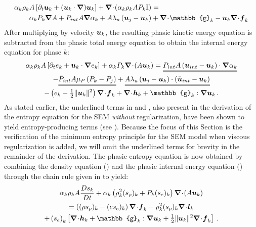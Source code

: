 %
\begin{align}\label{eq:vel-7-eqn-model-sect4}
\alpha_k \rho_k  A \left[ \partial_t \mbold u_k + (\mbold u_k \cdot \grad) \mbold u_k \right]  + \div \left( \alpha_k \rho_k A P_k \mathbb{I} \right) &=\nonumber\\
\alpha_k P_k \grad A + P_{int} A \grad \alpha_k + A \lambda_u \left( \mbold u_j - \mbold u_k \right) &+ \div \mathbb{g}_k - \mbold u_k \div \mbold f_k
\end{align}
%
After multiplying  by velocity $\boldsymbol u_k$, the resulting phasic kinetic energy equation is subtracted 
from the phasic total energy equation to obtain the internal energy equation for phase $k$:
%
\begin{multline}\label{eq:int-ener-7-eqn-model-sect4}
\alpha_k \rho_k  A \left[ \partial_t  e_k + \mbold u_k \cdot \grad  e_k \right]  
+ \alpha_k P_k \div (A \mbold u_k ) =
  \underline{\underline{P_{int} A \left(\mbold u_{int}-\mbold u_k \right) \cdot \grad \alpha_k}}  \\
- \underline{\underline{\bar{P}_{int} A \mu_P \left(P_k-P_j \right)}} 
+ \underline{\underline{A \lambda_u \left(\mbold u_j-\mbold u_k  \right) \cdot \left(\bar{\mbold u}_{int}- \mbold u_k \right)}}\\
-\left( e_k -  \tfrac{1}{2} \| \mbold u_k \|^2 \right) \div \mbold f_k 
+ \div \mbold h_k + \mathbb{g}_k : \grad \mbold u_k \,.
\end{multline}
%
As stated earlier, the underlined terms in  and , also present in the derivation of 
the entropy equation for the SEM \emph{without} regularization, have been shown to yield entropy-producing terms (see ). 
Because the focus of this Section is the verification of the minimum entropy principle for the SEM model when viscous regularization is added, 
we will omit the underlined terms for brevity in the remainder of the derivation. 
%
The phasic entropy equation is now obtained by combining the density equation () and the phasic 
internal energy equation () through the chain rule given in  to yield:
%
\begin{multline}\label{eq:ent-res-7-eqn-diss-terms}
\alpha_k \rho_k A \frac{Ds_k}{Dt} 
+ \alpha_k \left(  \rho^2_k  (s_\rho)_k + P_k (s_e)_k  \right) \div (A \mbold u_k )  \\
=  \left( (\rho s_\rho)_k - (e s_e)_k \right) \div \mbold f_k 
- \rho^2_k (s_\rho)_k \div \mbold l_k  \\
+ \left(s_e\right)_k \left[ \div \mbold h_k + \mathbb{g}_k : \grad \mbold u_k +  \tfrac{1}{2} \| \mbold u_k \|^2 \div \mbold f_k \right]
\,.
\end{multline}
